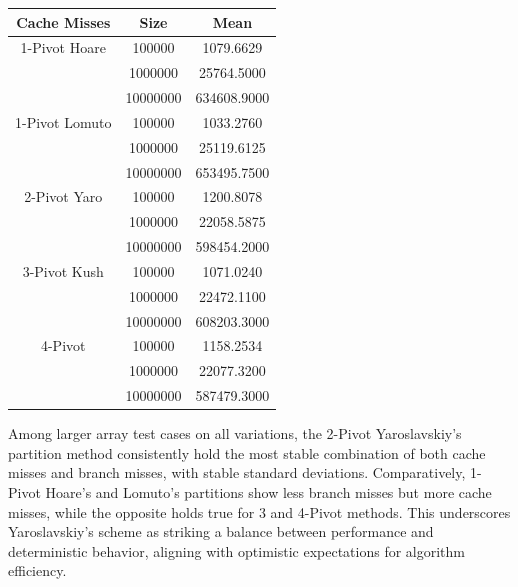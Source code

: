 \documentclass{article}
\begin{document}
\begin{center}
\small
\begin{tabular}{ |c c | c | }
    \hline
    Cache Misses    & Size     & Mean           \\
    \hline
    1-Pivot Hoare   & 100000   & 1079.6629      \\
                    & 1000000  & 25764.5000     \\
                    & 10000000 & 634608.9000    \\
    \hline
    1-Pivot Lomuto  & 100000   & 1033.2760      \\
                    & 1000000  & 25119.6125     \\
                    & 10000000 & 653495.7500    \\
    \hline
    2-Pivot Yaro    & 100000   & 1200.8078      \\
                    & 1000000  & 22058.5875     \\
                    & 10000000 & 598454.2000    \\
    \hline
    3-Pivot Kush    & 100000   & 1071.0240      \\
                    & 1000000  & 22472.1100     \\
                    & 10000000 & 608203.3000    \\
    \hline
    4-Pivot         & 100000   & 1158.2534      \\
                    & 1000000  & 22077.3200     \\
                    & 10000000 & 587479.3000    \\
    \hline
\end{tabular}
\end{center}

Among larger array test cases on all variations, the 2-Pivot Yaroslavskiy's partition method consistently hold the most stable combination of both cache misses and branch misses, with stable standard deviations.
Comparatively, 1-Pivot Hoare's and Lomuto's partitions show less branch misses but more cache misses, while the opposite holds true for 3 and 4-Pivot methods. This underscores Yaroslavskiy's scheme as striking a balance between performance and deterministic behavior, aligning with optimistic expectations for algorithm efficiency. 
\end{document}
